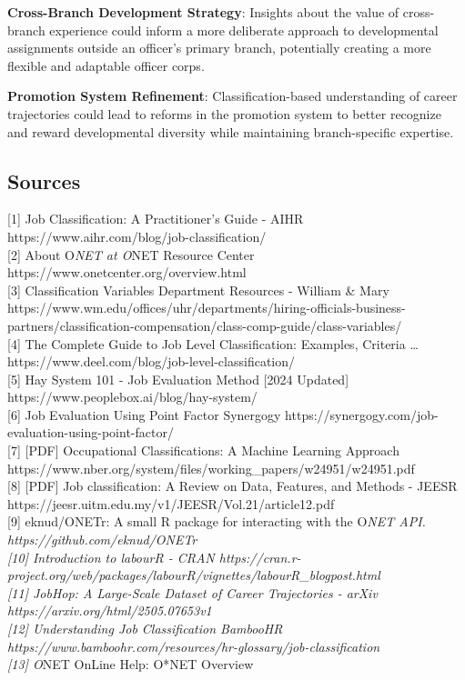 \documentclass[
  letterpaper,
  DIV=11,
  numbers=noendperiod]{scrartcl}
\begin{document}
\textbf{Cross-Branch Development Strategy}: Insights about the value of
cross-branch experience could inform a more deliberate approach to
developmental assignments outside an officer's primary branch,
potentially creating a more flexible and adaptable officer corps.

\textbf{Promotion System Refinement}: Classification-based understanding
of career trajectories could lead to reforms in the promotion system to
better recognize and reward developmental diversity while maintaining
branch-specific expertise.

\subsection{Sources}\label{sources}

{[}1{]} Job Classification: A Practitioner's Guide - AIHR
https://www.aihr.com/blog/job-classification/\\
{[}2{]} About O\emph{NET at O}NET Resource Center
https://www.onetcenter.org/overview.html\\
{[}3{]} Classification Variables \textbar{} Department Resources -
William \& Mary
https://www.wm.edu/offices/uhr/departments/hiring-officials-business-partners/classification-compensation/class-comp-guide/class-variables/\\
{[}4{]} The Complete Guide to Job Level Classification: Examples,
Criteria \ldots{} https://www.deel.com/blog/job-level-classification/\\
{[}5{]} Hay System 101 - Job Evaluation Method {[}2024 Updated{]}
https://www.peoplebox.ai/blog/hay-system/\\
{[}6{]} Job Evaluation Using Point Factor \textbar{} Synergogy
https://synergogy.com/job-evaluation-using-point-factor/\\
{[}7{]} {[}PDF{]} Occupational Classifications: A Machine Learning
Approach
https://www.nber.org/system/files/working\_papers/w24951/w24951.pdf\\
{[}8{]} {[}PDF{]} Job classification: A Review on Data, Features, and
Methods - JEESR
https://jeesr.uitm.edu.my/v1/JEESR/Vol.21/article12.pdf\\
{[}9{]} eknud/ONETr: A small R package for interacting with the
O\emph{NET API. https://github.com/eknud/ONETr\\
{[}10{]} Introduction to labourR - CRAN
https://cran.r-project.org/web/packages/labourR/vignettes/labourR\_blogpost.html\\
{[}11{]} JobHop: A Large-Scale Dataset of Career Trajectories - arXiv
https://arxiv.org/html/2505.07653v1\\
{[}12{]} Understanding Job Classification \textbar{} BambooHR
https://www.bamboohr.com/resources/hr-glossary/job-classification\\
{[}13{]} O}NET OnLine Help: O*NET Overview
\end{document}
